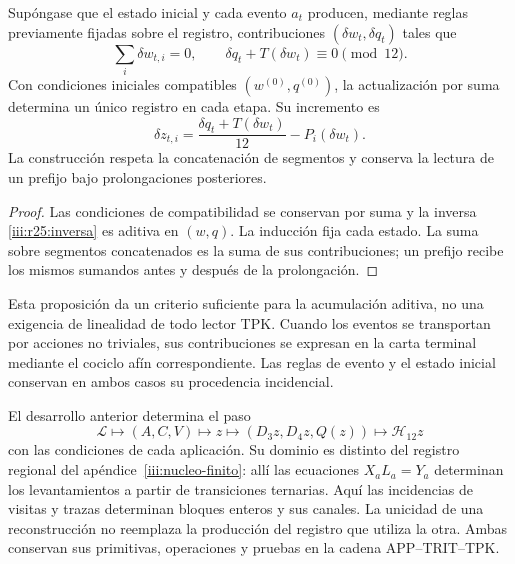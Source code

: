 \begin{proposition}
\label{iii:r25:eventos}
Supóngase que el estado inicial y cada evento $a_t$ producen,
mediante reglas previamente fijadas sobre el registro, contribuciones
$(\delta w_t,\delta q_t)$ tales que
\[
 \sum_i\delta w_{t,i}=0,
 \qquad \delta q_t+T(\delta w_t)\equiv0\pmod {12}.
\]
Con condiciones iniciales compatibles $(w^{(0)},q^{(0)})$,
la actualización por suma determina un único registro en cada etapa.
Su incremento es
\[
 \delta z_{t,i}=
 \frac{\delta q_t+T(\delta w_t)}{12}-P_i(\delta w_t).
\]
La construcción respeta la concatenación de segmentos y conserva
la lectura de un prefijo bajo prolongaciones posteriores.
\end{proposition}
\begin{proof}
Las condiciones de compatibilidad se conservan por suma y la
inversa \eqref{iii:r25:inversa} es aditiva en $(w,q)$.
La inducción fija cada estado. La suma sobre segmentos concatenados
es la suma de sus contribuciones; un prefijo recibe los mismos
sumandos antes y después de la prolongación.
\end{proof}

Esta proposición da un criterio suficiente para la acumulación
aditiva, no una exigencia de linealidad de todo lector TPK.
Cuando los eventos se transportan por acciones no triviales, sus
contribuciones se expresan en la carta terminal mediante el cociclo
afín correspondiente. Las reglas de evento y el estado inicial
conservan en ambos casos su procedencia incidencial.

El desarrollo anterior determina el paso
\[
 \mathscr L\longmapsto(A,C,V)\longmapsto z
 \longmapsto(D_3z,D_4z,Q(z))\longmapsto\mathcal H_{12}z
\]
con las condiciones de cada aplicación. Su dominio es distinto del
registro regional del apéndice~\ref{iii:nucleo-finito}: allí las
ecuaciones $X_aL_a=Y_a$ determinan los levantamientos a partir de
transiciones ternarias. Aquí las incidencias de visitas y trazas
determinan bloques enteros y sus canales. La unicidad de una
reconstrucción no reemplaza la producción del registro que utiliza
la otra. Ambas conservan sus primitivas, operaciones y pruebas en
la cadena APP--TRIT--TPK.
